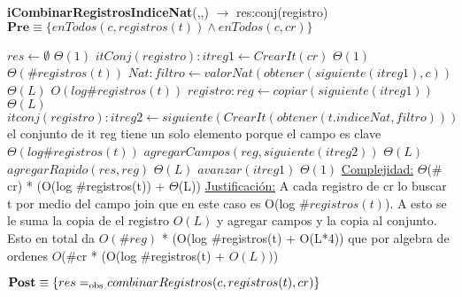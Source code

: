\begin{algorithm}[H]{\textbf{iCombinarRegistrosIndiceNat}(,,) $\to$ res:conj(registro)}
	{\\ $\textbf{Pre} \equiv \{enTodos(c,registros(t)) \land enTodos(c,cr)\}$}
	\begin{algorithmic}[1]
		\State $res \gets \emptyset$ \Comment $\Theta(1)$
		\State $itConj(registro): itreg1 \gets CrearIt(cr)$ \Comment	$\Theta(1)$
		 \Comment $\Theta(\#registros(t))$
			\State $Nat: filtro \gets valorNat(obtener(siguiente(itreg1),c))$ \Comment $\Theta(L)$
			 \Comment $O(log \#registros(t))$
				\State $registro: reg \gets copiar(siguiente(itreg1))$ \Comment $\Theta(L)$
				\State $itconj(registro): itreg2 \gets siguiente(CrearIt(obtener(t.indiceNat,filtro)))$ \Comment el conjunto de it reg tiene un solo elemento porque el campo es clave $\Theta(log \#registros(t))$
				\State $agregarCampos(reg,siguiente(itreg2))$	\Comment $\Theta(L)$
				\State $agregarRapido(res,reg)$	\Comment $\Theta(L)$
			\EndIf
			\State $avanzar(itreg1)$	\Comment $\Theta(1)$
		\EndWhile
		\medskip
		\Statex \underline{Complejidad:} $\Theta$($\#$cr) * (O(log $\#$registros(t)) + $\Theta$(L))
		\Statex \underline{Justificación:} A cada registro de cr lo buscar t por medio del campo join que en este caso es O(log $\#registros(t)$). A esto se le suma la copia de el registro $O(L)$ y agregar campos y la copia al conjunto. Esto en total da $O(\#reg)$ * (O(log $\#$registros(t) + O(L*4)) que por algebra de ordenes $O$($\#$cr * (O(log $\#$registros(t) + $O(L))$)
	\end{algorithmic}
	{$\textbf{Post} \equiv \{res =_{\mathrm{obs}} combinarRegistros(c,registros(t),cr)\}$}
\end{algorithm}

